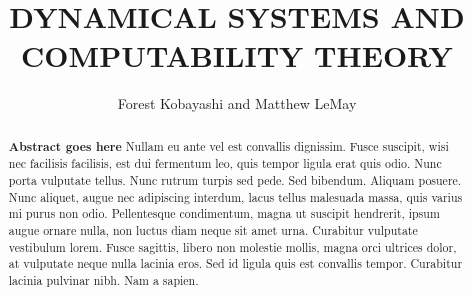 \documentclass{fkpaper}
\title{DYNAMICAL SYSTEMS AND COMPUTABILITY THEORY}
\author{Forest Kobayashi and Matthew LeMay}
\affiliation{Department of Mathematics, Harvey Mudd College,
  Claremont, CA, 91711}
\begin{document}



\begin{abstract}
  \textbf{Abstract goes here} Nullam eu ante vel est convallis
  dignissim. Fusce suscipit, wisi nec facilisis facilisis, est dui
  fermentum leo, quis tempor ligula erat quis odio. Nunc porta
  vulputate tellus. Nunc rutrum turpis sed pede. Sed bibendum. Aliquam
  posuere. Nunc aliquet, augue nec adipiscing interdum, lacus tellus
  malesuada massa, quis varius mi purus non odio. Pellentesque
  condimentum, magna ut suscipit hendrerit, ipsum augue ornare nulla,
  non luctus diam neque sit amet urna. Curabitur vulputate vestibulum
  lorem. Fusce sagittis, libero non molestie mollis, magna orci
  ultrices dolor, at vulputate neque nulla lacinia eros. Sed id ligula
  quis est convallis tempor. Curabitur lacinia pulvinar nibh. Nam a
  sapien.
\end{abstract}


\end{document}
